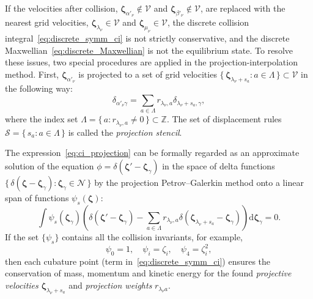 \documentclass[10pt]{article}
\newcommand{\dd}{\mathrm{d}}
\newcommand{\dzeta}{\boldsymbol{\dd\zeta}}
\newcommand{\bzeta}{\boldsymbol{\zeta}}
\newcommand{\Nu}{\mathcal{N}}
\newcommand{\Set}[2]{\{\,{#1}:{#2}\,\}}
\begin{document}
If the velocities after collision,
\(\bzeta_{\alpha'_\nu}\notin\mathcal{V}\) and \(\bzeta_{\beta'_\nu}\notin\mathcal{V}\),
are replaced with the nearest grid velocities,
\(\bzeta_{\lambda_\nu}\in\mathcal{V}\) and \(\bzeta_{\mu_\nu}\in\mathcal{V}\),
the discrete collision integral~\eqref{eq:discrete_symm_ci} is not strictly conservative,
and the discrete Maxwellian~\eqref{eq:discrete_Maxwellian} is not the equilibrium state.
To resolve these issues, two special procedures are applied in the projection-interpolation method.
First, \(\bzeta_{\alpha'_\nu}\) is projected to a set of grid velocities
\(\Set{\bzeta_{\lambda_\nu+s_a}}{a\in\Lambda}\subset\mathcal{V}\) in the following way:
\begin{equation}\label{eq:ci_projection}
    \delta_{\alpha'_\nu\gamma} = \sum_{a\in\Lambda} r_{\lambda_\nu,a}\delta_{\lambda_\nu+s_a,\gamma},
\end{equation}
where the index set \(\Lambda = \Set{a}{r_{\lambda_\nu,a}\neq0}\subset\mathbb{Z}\).
The set of displacement rules \(\mathcal{S} = \Set{s_a}{a\in\Lambda}\)
is called the \emph{projection stencil}.

The expression~\eqref{eq:ci_projection} can be formally regarded as an approximate solution of the equation
\(\phi=\delta(\bzeta'-\bzeta_\gamma)\) in the space of delta functions
\(\Set{\delta(\bzeta-\bzeta_\gamma)}{\bzeta_\gamma\in\Nu}\)
by the projection Petrov--Galerkin method onto a linear span of functions \(\psi_s(\bzeta)\):
\begin{equation}\label{eq:Petrov-Galerkin}
    \int \psi_s(\bzeta_\gamma) \left( \delta(\bzeta'-\bzeta_\gamma)
        - \sum_{a\in\Lambda} r_{\lambda_\nu,a} \delta(\bzeta_{\lambda_\nu+s_a}-\bzeta_\gamma) \right) \dzeta_\gamma = 0.
\end{equation}
If the set \(\{\psi_s\}\) contains all the collision invariants, for example,
\begin{equation}\label{eq:collision_invariants}
    \psi_0 = 1, \quad \psi_i = \zeta_i, \quad \psi_4 = \zeta_i^2,
\end{equation}
then each cubature point (term in~\eqref{eq:discrete_symm_ci}) ensures the conservation of mass, momentum and kinetic energy
for the found \textit{projective velocities} \(\bzeta_{\lambda_\nu+s_a}\) and \textit{projection weights} \(r_{\lambda_\nu a}\).
\end{document}
